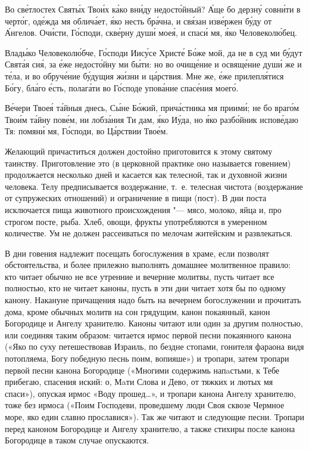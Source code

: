 \begin{mymulticols}
Во св\'{е}тлостех Свят\'{ы}х Тво\'{и}х к\'{а}ко вн\'{и}ду недост\'{о}йный? \'{А}ще бо дерзн\'{у} совн\'{и}ти в черт\'{о}г, од\'{е}жда мя облич\'{а}ет, \'{я}ко несть бр\'{а}чна, и св\'{я}зан изв\'{е}ржен б\'{у}ду от \'{А}нгелов. Оч\'{и}сти, Г\'{о}споди, скв\'{е}рну душ\'{и} мое\'{я}, и спас\'{и} мя, \'{я}ко Человекол\'{ю}бец.


Влад\'{ы}ко Человекол\'{ю}бче, Г\'{о}споди Иис\'{у}се Христ\'{е} Б\'{о}же мой, да не в суд ми б\'{у}дут Свят\'{а}я си\'{я}, за \'{е}же недост\'{о}йну ми б\'{ы}ти: но во очищ\'{е}ние и освящ\'{е}ние душ\'{и} же и т\'{е}ла, и во обруч\'{е}ние б\'{у}дущия ж\'{и}зни и ц\'{а}рствия. Мне же, \'{е}же прилепл\'{я}тися Б\'{о}гу, бл\'{а}го \'{е}сть, полаг\'{а}ти во Г\'{о}споде упов\'{а}ние спас\'{е}ния моег\'{о}.


В\'{е}чери Твое\'{я} т\'{а}йныя днесь, С\'{ы}не Б\'{о}жий, прич\'{а}стника мя приим\'{и}; не бо враг\'{о}м Тво\'{и}м т\'{а}йну пов\'{е}м, ни лобз\'{а}ния Ти дам, \'{я}ко И\'{у}да, но \'{я}ко разб\'{о}йник испов\'{е}даю Тя: помян\'{и} мя, Г\'{о}споди, во Ц\'{а}рствии Тво\'{е}м.

\end{mymulticols}

\myparsep[0.25]

\medskip Желающий причаститься должен достойно приготовится к этому святому таинству. Приготовление это (в церковной практике оно называется говением) продолжается несколько дней и касается как телесной, так и духовной жизни человека. Телу предписывается воздержание, т.~е. телесная чистота (воздержание от супружеских отношений) и ограничение в пищи (пост). В дни поста исключается пища животного происхождения "--- мясо, молоко, яйца и, про строгом посте, рыба. Хлеб, овощи, фрукты употребляются в умеренном количестве. Ум не должен рассеиваться по мелочам житейским и развлекаться.

В дни говения надлежит посещать богослужения в храме, если позволят обстоятельства, и более прилежно выполнять домашнее молитвенное правило: кто читает обычно не все утренние и вечерние молитвы, пусть читает все полностью, кто не читает каноны, пусть в эти дни читает хотя бы по одному канону. Накануне причащения надо быть на вечернем богослужении и прочитать дома, кроме обычных молитв на сон грядущим, канон покаянный, канон Богородице и Ангелу хранителю. Каноны читают или один за другим полностью, или соединяя таким образом: читается ирмос первой песни покаянного канона («Яко по суху петешествовав Израиль, по бездне стопами, гонителя фараона видя потопляема, Богу победную песнь поим, вопияше») и тропари, затем тропари первой песни канона Богородице («Многими содержимь напaстьми, к Тебе прибегаю, спасения иский: о, Мaти Слова и Дево, от тяжких и лютых мя спаси»), опуская ирмос «Воду прошед…», и тропари канона Ангелу хранителю, тоже без ирмоса («Поим Господеви, проведшему люди Своя сквозе Чермное море, яко един славно прославися»). Так же читают и следующие песни. Тропари перед каноном Богородице и Ангелу хранителю, а также стихиры после канона Богородице в таком случае опускаются.

